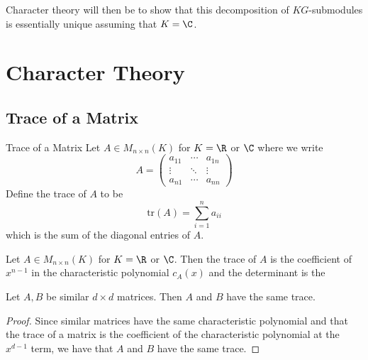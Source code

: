 \documentclass[a4paper]{article}
\begin{document}
Character theory will then be to show that this decomposition of $KG$-submodules is essentially unique assuming that $K=\C$. 

\pagebreak
\section{Character Theory}
\subsection{Trace of a Matrix}
\begin{defn}{Trace of a Matrix}{} Let $A\in M_{n\times n}(K)$ for $K=\R$ or $\C$ where we write $$A=\begin{pmatrix}
a_{11} & \cdots & a_{1n}\\
\vdots & \ddots & \vdots\\
a_{n1} & \cdots & a_{nn}
\end{pmatrix}$$ Define the trace of $A$ to be $$\text{tr}(A)=\sum_{i=1}^na_{ii}$$ which is the sum of the diagonal entries of $A$. 
\end{defn}

\begin{prp}{}{} Let $A\in M_{n\times n}(K)$ for $K=\R$ or $\C$. Then the trace of $A$ is the coefficient of $x^{n-1}$ in the characteristic polynomial $c_A(x)$ and the determinant is the 
\end{prp}

\begin{lmm}{}{} Let $A,B$ be similar $d\times d$ matrices. Then $A$ and $B$ have the same trace. \tcbline
\begin{proof}
Since similar matrices have the same characteristic polynomial and that the trace of a matrix is the coefficient of the characteristic polynomial at the $x^{d-1}$ term, we have that $A$ and $B$ have the same trace. 
\end{proof}
\end{lmm}
\end{document}
